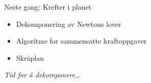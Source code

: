 \documentclass[aspectratio=169, 12pt]{beamer}
\begin{document}
\begin{frame}{}


\end{frame}

\begin{frame}
\begin{center}
  \Huge{Neste gang: Krefter i planet}
  \begin{itemize}
    \item Dekomponering av Newtons lover
    \item Algoritme for sammensatte kraftoppgaver
    \item Skråplan
  \end{itemize}
  \vspace{6mm}
  {\normalsize\itshape Tid for å dekomponere\ldots}
\end{center}
\end{frame}
\end{document}
